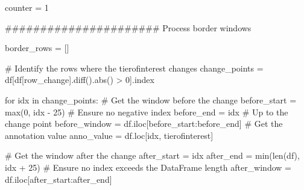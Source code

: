 \documentclass[
  letterpaper,
  DIV=11,
  numbers=noendperiod]{scrreprt}
\newenvironment{Shaded}{\begin{snugshade}}{\end{snugshade}}
\newcommand{\BuiltInTok}[1]{\textcolor[rgb]{0.00,0.23,0.31}{#1}}
\newcommand{\CommentTok}[1]{\textcolor[rgb]{0.37,0.37,0.37}{#1}}
\newcommand{\ControlFlowTok}[1]{\textcolor[rgb]{0.00,0.23,0.31}{#1}}
\newcommand{\DecValTok}[1]{\textcolor[rgb]{0.68,0.00,0.00}{#1}}
\newcommand{\KeywordTok}[1]{\textcolor[rgb]{0.00,0.23,0.31}{#1}}
\newcommand{\NormalTok}[1]{\textcolor[rgb]{0.00,0.23,0.31}{#1}}
\newcommand{\OperatorTok}[1]{\textcolor[rgb]{0.37,0.37,0.37}{#1}}
\newcommand{\StringTok}[1]{\textcolor[rgb]{0.13,0.47,0.30}{#1}}
\begin{document}
\begin{Shaded}
\begin{Highlighting}[]
\NormalTok{        counter }\OperatorTok{=} \DecValTok{1}

        \CommentTok{\#\#\#\#\#\#\#\#\#\#\#\#\#\#\#\#\#\#\#\#\#\# Process border windows}

\NormalTok{        border\_rows }\OperatorTok{=}\NormalTok{ []}

        \CommentTok{\# Identify the rows where the tierofinterest changes}
\NormalTok{        change\_points }\OperatorTok{=}\NormalTok{ df[df[}\StringTok{\textquotesingle{}row\_change\textquotesingle{}}\NormalTok{].diff().}\BuiltInTok{abs}\NormalTok{() }\OperatorTok{\textgreater{}} \DecValTok{0}\NormalTok{].index}

        \ControlFlowTok{for}\NormalTok{ idx }\KeywordTok{in}\NormalTok{ change\_points:}
            \CommentTok{\# Get the window before the change}
\NormalTok{            before\_start }\OperatorTok{=} \BuiltInTok{max}\NormalTok{(}\DecValTok{0}\NormalTok{, idx }\OperatorTok{{-}} \DecValTok{25}\NormalTok{)  }\CommentTok{\# Ensure no negative index}
\NormalTok{            before\_end }\OperatorTok{=}\NormalTok{ idx  }\CommentTok{\# Up to the change point}
\NormalTok{            before\_window }\OperatorTok{=}\NormalTok{ df.iloc[before\_start:before\_end]}
            \CommentTok{\# Get the annotation value}
\NormalTok{            anno\_value }\OperatorTok{=}\NormalTok{ df.loc[idx, tierofinterest]}

            \CommentTok{\# Get the window after the change}
\NormalTok{            after\_start }\OperatorTok{=}\NormalTok{ idx}
\NormalTok{            after\_end }\OperatorTok{=} \BuiltInTok{min}\NormalTok{(}\BuiltInTok{len}\NormalTok{(df), idx }\OperatorTok{+} \DecValTok{25}\NormalTok{)  }\CommentTok{\# Ensure no index exceeds the DataFrame length}
\NormalTok{            after\_window }\OperatorTok{=}\NormalTok{ df.iloc[after\_start:after\_end]}


\end{Highlighting}
\end{Shaded}
\end{document}
